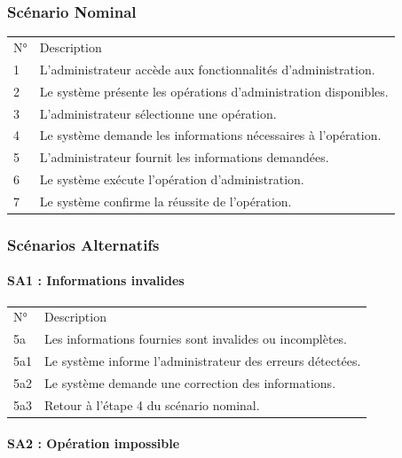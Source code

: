 \documentclass[
]{article}
\begin{document}
\hypertarget{scuxe9nario-nominal-6}{%
\subsubsection{Scénario Nominal}\label{scuxe9nario-nominal-6}}

\begin{longtable}[]{@{}ll@{}}
\toprule
\endhead
N° & Description \\
1 & L'administrateur accède aux fonctionnalités d'administration. \\
2 & Le système présente les opérations d'administration disponibles. \\
3 & L'administrateur sélectionne une opération. \\
4 & Le système demande les informations nécessaires à l'opération. \\
5 & L'administrateur fournit les informations demandées. \\
6 & Le système exécute l'opération d'administration. \\
7 & Le système confirme la réussite de l'opération. \\
\bottomrule
\end{longtable}

\hypertarget{scuxe9narios-alternatifs-6}{%
\subsubsection{Scénarios Alternatifs}\label{scuxe9narios-alternatifs-6}}

\hypertarget{sa1-informations-invalides-1}{%
\paragraph{SA1 : Informations
invalides}\label{sa1-informations-invalides-1}}

\begin{longtable}[]{@{}ll@{}}
\toprule
\endhead
N° & Description \\
5a & Les informations fournies sont invalides ou incomplètes. \\
5a1 & Le système informe l'administrateur des erreurs détectées. \\
5a2 & Le système demande une correction des informations. \\
5a3 & Retour à l'étape 4 du scénario nominal. \\
\bottomrule
\end{longtable}

\hypertarget{sa2-opuxe9ration-impossible}{%
\paragraph{SA2 : Opération
impossible}\label{sa2-opuxe9ration-impossible}}
\end{document}
